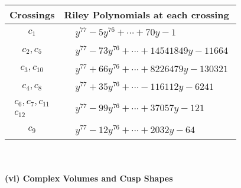 \documentclass[1p]{elsarticle_modified}
\theoremstyle{definition}
\begin{document}
\begin{tabular}{m{50pt}|m{274pt}}
Crossings & \hspace{64pt}Riley Polynomials at each crossing \\
\hline $$\begin{aligned}c_{1}\end{aligned}$$&$\begin{aligned}
&y^{77}-5 y^{76}+\cdots+70 y-1
\end{aligned}$\\
\hline $$\begin{aligned}c_{2},c_{5}\end{aligned}$$&$\begin{aligned}
&y^{77}-73 y^{76}+\cdots+14541849 y-11664
\end{aligned}$\\
\hline $$\begin{aligned}c_{3},c_{10}\end{aligned}$$&$\begin{aligned}
&y^{77}+66 y^{76}+\cdots+8226479 y-130321
\end{aligned}$\\
\hline $$\begin{aligned}c_{4},c_{8}\end{aligned}$$&$\begin{aligned}
&y^{77}+35 y^{76}+\cdots-116112 y-6241
\end{aligned}$\\
\hline $$\begin{aligned}c_{6},c_{7},c_{11}\\c_{12}\end{aligned}$$&$\begin{aligned}
&y^{77}-99 y^{76}+\cdots+37057 y-121
\end{aligned}$\\
\hline $$\begin{aligned}c_{9}\end{aligned}$$&$\begin{aligned}
&y^{77}-12 y^{76}+\cdots+2032 y-64
\end{aligned}$\\
\hline
\end{tabular}\\~\\
\newpage\flushleft \textbf{(vi) Complex Volumes and Cusp Shapes}
\end{document}
